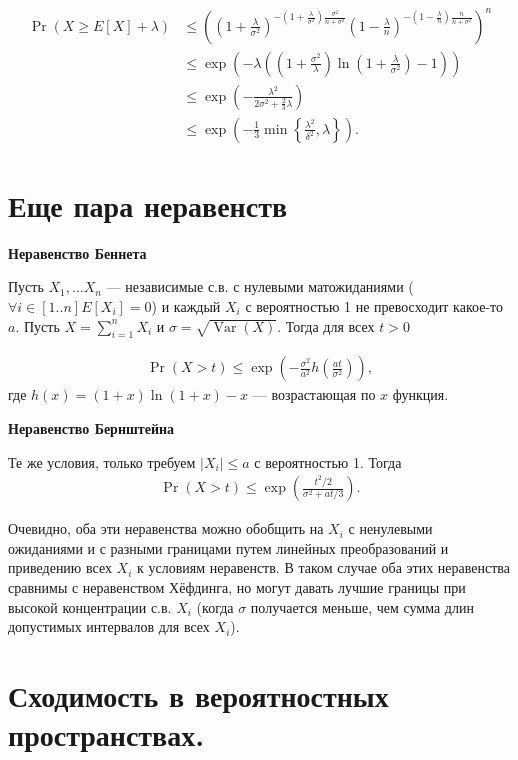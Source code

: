 \documentclass[12pt]{article}
\DeclareMathOperator{\Var}{Var}
\begin{document}
\begin{align*}
  \Pr(X \ge E[X] + \lambda) &\le \left(\left(1 + \frac{\lambda}{\sigma^2}\right)^{-(1 + \frac{\lambda}{\sigma^2})\frac{\sigma^2}{n + \sigma^2}} \left(1 - \frac{\lambda}{n}\right)^{-(1 - \frac{\lambda}{n})\frac{n}{n + \sigma^2}} \right)^n \\
  &\le \exp\left(-\lambda\left(\left(1 + \frac{\sigma^2}{\lambda}\right)\ln\left(1 + \frac{\lambda}{\sigma^2}\right) - 1\right)\right) \\
  &\le \exp\left(-\frac{\lambda^2}{2\sigma^2 + \frac{2}{3}\lambda}\right) \\
  &\le \exp\left(-\frac{1}{3} \min\left\{ \frac{\lambda^2}{\delta^2}, \lambda\right\}\right).
\end{align*}

\section{Еще пара неравенств}

\textbf{Неравенство Беннета}

Пусть $X_1, \dots X_n$ --- независимые с.в. с нулевыми матожиданиями ($\forall i\in[1..n] E[X_i] = 0$) и каждый $X_i$ с вероятностью 1 не превосходит какое-то $a$. Пусть $X = \sum_{i = 1}^n X_i$ и $\sigma = \sqrt{\Var(X)}$. Тогда для всех $t > 0$

\begin{align*}
  \Pr(X > t) \le \exp\left(-\frac{\sigma^2}{a^2} h\left(\frac{at}{\sigma^2}\right)\right),
\end{align*}
где $h(x) = (1 + x)\ln(1 + x) - x$ --- возрастающая по $x$ функция.

\textbf{Неравенство Бернштейна}

Те же условия, только требуем $|X_i| \le a$ с вероятностью 1. Тогда 
\begin{align*}
  \Pr(X > t) \le \exp\left(\frac{t^2 / 2}{\sigma^2 + at/3}\right).
\end{align*}

Очевидно, оба эти неравенства можно обобщить на $X_i$ с ненулевыми ожиданиями и с разными границами путем линейных преобразований и приведению всех $X_i$ к условиям неравенств. В таком случае оба этих неравенства сравнимы с неравенством Хёфдинга, но могут давать лучшие границы при высокой концентрации с.в. $X_i$ (когда $\sigma$ получается меньше, чем сумма длин допустимых интервалов для всех $X_i$).

\section{Сходимость в вероятностных пространствах.}
\end{document}
